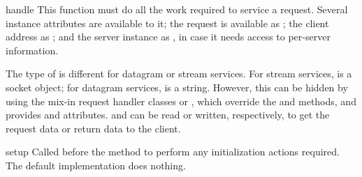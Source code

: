 \begin{funcdesc}{handle}{}
This function must do all the work required to service a request.
Several instance attributes are available to it; the request is
available as ; the client address as
; and the server instance as
, in case it needs access to per-server
information.

The type of  is different for datagram or stream
services.  For stream services,  is a socket
object; for datagram services,  is a string.
However, this can be hidden by using the mix-in request handler
classes
 or , which
override the  and  methods, and
provides  and  attributes.
 and  can be read or written,
respectively, to get the request data or return data to the client.
\end{funcdesc}

\begin{funcdesc}{setup}{}
Called before the  method to perform any
initialization actions required.  The default implementation does
nothing.
\end{funcdesc}
